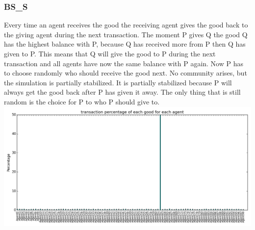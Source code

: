 \documentclass[twoside,openright]{uva-bachelor-thesis}
\begin{document}
\subsubsection{BS\_S}
Every time an agent receives the good the receiving agent gives the good back to the giving agent during the next transaction. The moment P gives Q the good Q has the highest balance with P, because Q has received more from P then Q has given to P. This means that Q will give the good to P during the next transaction and all agents have now the same balance with P again. Now P has to choose randomly who should receive the good next. No community arises, but the simulation is partially stabilized. It is partially stabilized because P will always get the good back after P has given it away. The only thing that is still random is the choice for P to who P should give to. \\
\includegraphics[scale=0.4]{experiment_images/BR_BS_S}
\end{document}
